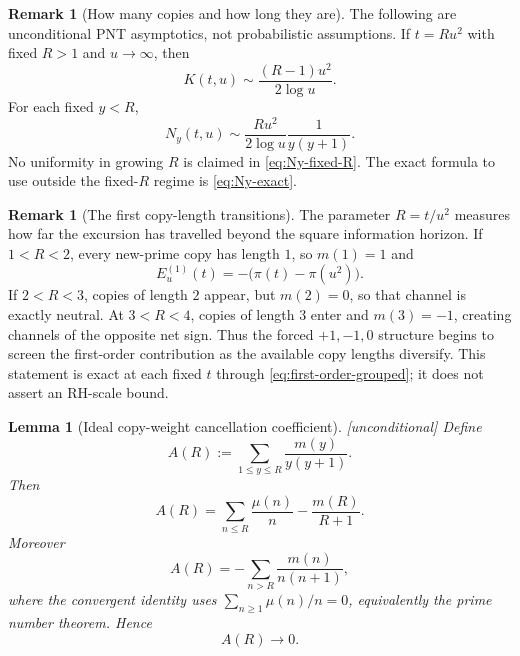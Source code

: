 \documentclass[11pt,reqno]{amsart}
\theoremstyle{plain}
\newtheorem{lemma}[theorem]{Lemma}
\theoremstyle{definition}
\newtheorem{remark}[theorem]{Remark}
\begin{document}
\begin{remark}[How many copies and how long they are]
\label{rem:copy-count-asymptotic}
The following are unconditional PNT asymptotics, not probabilistic
assumptions.  If $t=Ru^2$ with fixed $R>1$ and $u\to\infty$, then
\begin{equation}
\label{eq:K-fixed-R}
  K(t,u)\sim \frac{(R-1)u^2}{2\log u}.
\end{equation}
For each fixed $y<R$,
\begin{equation}
\label{eq:Ny-fixed-R}
  N_y(t,u)
  \sim
  \frac{Ru^2}{2\log u}\frac1{y(y+1)}.
\end{equation}
No uniformity in growing $R$ is claimed in \eqref{eq:Ny-fixed-R}.  The exact
formula to use outside the fixed-$R$ regime is \eqref{eq:Ny-exact}.
\end{remark}

\begin{remark}[The first copy-length transitions]
\label{rem:first-copy-transitions}
The parameter $R=t/u^2$ measures how far the excursion has travelled beyond
the square information horizon.  If $1<R<2$, every new-prime copy has length
$1$, so $m(1)=1$ and
\[
  E_u^{(1)}(t)=-\bigl(\pi(t)-\pi(u^2)\bigr).
\]
If $2<R<3$, copies of length $2$ appear, but $m(2)=0$, so that channel is
exactly neutral.  At $3<R<4$, copies of length $3$ enter and
$m(3)=-1$, creating channels of the opposite net sign.  Thus the forced
$+1,-1,0$ structure begins to screen the first-order contribution as the
available copy lengths diversify.  This statement is exact at each fixed
$t$ through \eqref{eq:first-order-grouped}; it does not assert an RH-scale
bound.
\end{remark}

\begin{lemma}[Ideal copy-weight cancellation coefficient]
\label{lem:copy-weight-coefficient}
\emph{[unconditional]} Define
\begin{equation}
\label{eq:AR-def}
  A(R):=\sum_{1\le y\le R}\frac{m(y)}{y(y+1)}.
\end{equation}
Then
\begin{equation}
\label{eq:AR-exact}
  \boxed{\qquad
  A(R)=\sum_{n\le R}\frac{\mu(n)}n-\frac{m(R)}{R+1}.
  \qquad}
\end{equation}
Moreover
\begin{equation}
\label{eq:AR-tail}
  A(R)=-\sum_{n>R}\frac{m(n)}{n(n+1)},
\end{equation}
where the convergent identity uses
$\sum_{n\ge1}\mu(n)/n=0$, equivalently the prime number theorem.  Hence
\begin{equation}
\label{eq:AR-zero}
  A(R)\longrightarrow0.
\end{equation}
\end{lemma}
\end{document}
